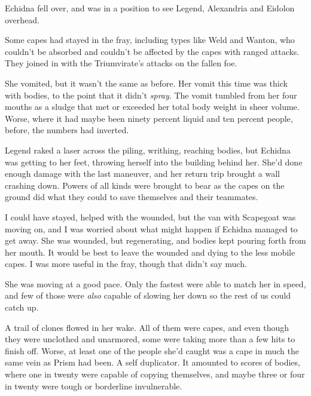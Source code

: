 Echidna fell over, and was in a position to see Legend, Alexandria and Eidolon overhead.



Some capes had stayed in the fray, including types like Weld and Wanton, who couldn't be absorbed and couldn't be affected by the capes with ranged attacks.  They joined in with the Triumvirate's attacks on the fallen foe.



She vomited, but it wasn't the same as before.  Her vomit this time was thick with bodies, to the point that it didn't \emph{spray}.  The vomit tumbled from her four mouths as a sludge that met or exceeded her total body weight in sheer volume.  Worse, where it had maybe been ninety percent liquid and ten percent people, before, the numbers had inverted.



Legend raked a laser across the piling, writhing, reaching bodies, but Echidna was getting to her feet, throwing herself into the building behind her.  She'd done enough damage with the last maneuver, and her return trip brought a wall crashing down.  Powers of all kinds were brought to bear as the capes on the ground did what they could to save themselves and their teammates.



I could have stayed, helped with the wounded, but the van with Scapegoat was moving on, and I was worried about what might happen if Echidna managed to get away.  She was wounded, but regenerating, and bodies kept pouring forth from her mouth.  It would be best to leave the wounded and dying to the less mobile capes.  I was more useful in the fray, though that didn't say much.



She was moving at a good pace.  Only the fastest were able to match her in speed, and few of those were \emph{also} capable of slowing her down so the rest of us could catch up.



A trail of clones flowed in her wake.  All of them were capes, and even though they were unclothed and unarmored, some were taking more than a few hits to finish off.  Worse, at least one of the people she'd caught was a cape in much the same vein as Prism had been.  A self duplicator.  It amounted to scores of bodies, where one in twenty were capable of copying themselves, and maybe three or four in twenty were tough or borderline invulnerable.



